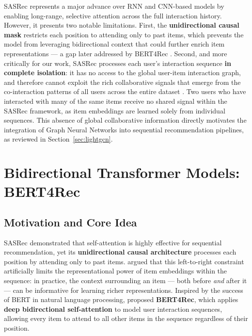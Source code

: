 \documentclass[12pt,a4paper]{report}
\newcommand{\textcite}[1]{\citet{#1}}
\newcommand{\parencite}[1]{\citep{#1}}
\begin{document}
SASRec represents a major advance over RNN and CNN-based models by
enabling long-range, selective attention across the full interaction
history. However, it presents two notable limitations. First, the
\textbf{unidirectional causal mask} restricts each position to
attending only to past items, which prevents the model from
leveraging bidirectional context that could further enrich item
representations --- a gap later addressed by BERT4Rec
\parencite{sun2019bert4rec}. Second, and more critically for our
work, SASRec processes each user's interaction sequence
\textbf{in complete isolation}: it has no access to the global
user-item interaction graph, and therefore cannot exploit the rich
collaborative signals that emerge from the co-interaction patterns
of all users across the entire dataset \parencite{kang2018self}.
Two users who have interacted with many of the same items receive
no shared signal within the SASRec framework, as item embeddings
are learned solely from individual sequences. This absence of global
collaborative information directly motivates the integration of
Graph Neural Networks into sequential recommendation pipelines,
as reviewed in Section~\ref{sec:lightgcn}.


\section{Bidirectional Transformer Models: BERT4Rec}

\subsection{Motivation and Core Idea}

SASRec demonstrated that self-attention is highly effective for
sequential recommendation, yet its \textbf{unidirectional causal
architecture} processes each position by attending only to past
items. \textcite{sun2019bert4rec} argued that this left-to-right
constraint artificially limits the representational power of item
embeddings within the sequence: in practice, the context
surrounding an item --- both before \textit{and} after it ---
can be informative for learning richer representations.
Inspired by the success of BERT in natural language processing,
\textcite{sun2019bert4rec} proposed \textbf{BERT4Rec}, which
applies \textbf{deep bidirectional self-attention} to model user
interaction sequences, allowing every item to attend to all other
items in the sequence regardless of their position.
\end{document}
